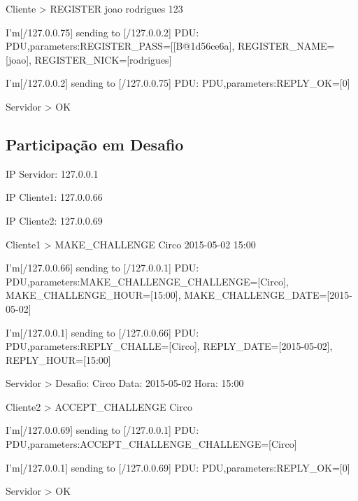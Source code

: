 \documentclass[runningheads,a4paper]{llncs}
\begin{document}
Cliente > REGISTER joao rodrigues 123

I'm[/127.0.0.75] sending to [/127.0.0.2] PDU: PDU,parameters:{REGISTER_PASS=[[B@1d56ce6a], REGISTER_NAME=[joao], REGISTER_NICK=[rodrigues]}

I'm[/127.0.0.2] sending to [/127.0.0.75] PDU: PDU,parameters:{REPLY_OK=[0]}

Servidor > OK

\subsection{Participação em Desafio}

\begin{itemsize}

\item IP Servidor: 127.0.0.1
\item IP Cliente1: 127.0.0.66
\item IP Cliente2: 127.0.0.69

\end{itemsize}

Cliente1 > MAKE_CHALLENGE Circo 2015-05-02 15:00

I'm[/127.0.0.66] sending to [/127.0.0.1] PDU: PDU,parameters:{MAKE_CHALLENGE_CHALLENGE=[Circo], MAKE_CHALLENGE_HOUR=[15:00], MAKE_CHALLENGE_DATE=[2015-05-02]}

I'm[/127.0.0.1] sending to [/127.0.0.66] PDU: PDU,parameters:{REPLY_CHALLE=[Circo], REPLY_DATE=[2015-05-02], REPLY_HOUR=[15:00]}

Servidor >  Desafio: Circo Data: 2015-05-02 Hora: 15:00

Cliente2 > ACCEPT_CHALLENGE Circo

I'm[/127.0.0.69] sending to [/127.0.0.1] PDU: PDU,parameters:{ACCEPT_CHALLENGE_CHALLENGE=[Circo]}

I'm[/127.0.0.1] sending to [/127.0.0.69] PDU: PDU,parameters:{REPLY_OK=[0]}

Servidor > OK
\end{document}
